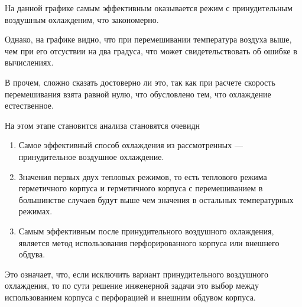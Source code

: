 На данной графике самым эффективным оказывается режим с принудительным
воздушным охлажденим, что закономерно.

Однако, на графике видно, что при перемешивании температура воздуха
выше, чем при его отсуствии на два градуса, что может
свидетельствовать об ошибке в вычислениях.

В прочем, сложно сказать достоверно ли это, так как при расчете
скорость перемешивания взята равной нулю, что обусловлено тем, что
охлаждение естественное.


На этом этапе становится анализа становятся очевидн
\begin{enumerate}[label={\arabic*.}]

\item Самое эффективный способ охлаждения из рассмотренных
  — принудительное воздушное охлаждение.
\item Значения первых двух тепловых режимов, то есть теплового режима
  герметичного корпуса и герметичного корпуса с перемешиванием в
  большинстве случаев будут выше чем значения в остальных температурных режимах.

\item Самым эффективным после принудительного воздушного охлаждения,
  является метод использования перфорированного корпуса или внешнего
  обдува.
\end{enumerate}

Это означает, что, если исключить вариант принудительного воздушного
охлаждения, то по сути решение инженерной задачи это выбор между
использованием корпуса с перфорацией и внешним обдувом корпуса.


